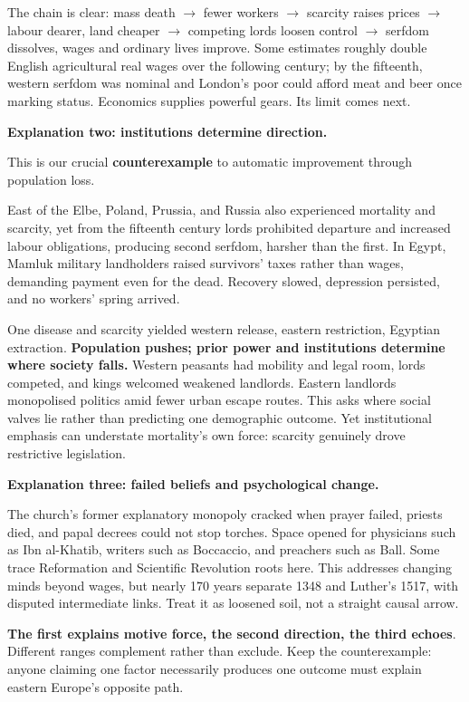 The chain is clear: mass death $\rightarrow$ fewer workers $\rightarrow$ scarcity raises prices $\rightarrow$ labour dearer, land cheaper $\rightarrow$ competing lords loosen control $\rightarrow$ serfdom dissolves, wages and ordinary lives improve. Some estimates roughly double English agricultural real wages over the following century; by the fifteenth, western serfdom was nominal and London's poor could afford meat and beer once marking status. Economics supplies powerful gears. Its limit comes next.

\textbf{Explanation two: institutions determine direction.}

This is our crucial \textbf{counterexample} to automatic improvement through population loss.

East of the Elbe, Poland, Prussia, and Russia also experienced mortality and scarcity, yet from the fifteenth century lords prohibited departure and increased labour obligations, producing second serfdom, harsher than the first. In Egypt, Mamluk military landholders raised survivors' taxes rather than wages, demanding payment even for the dead. Recovery slowed, depression persisted, and no workers' spring arrived.

One disease and scarcity yielded western release, eastern restriction, Egyptian extraction. \textbf{Population pushes; prior power and institutions determine where society falls.} Western peasants had mobility and legal room, lords competed, and kings welcomed weakened landlords. Eastern landlords monopolised politics amid fewer urban escape routes. This asks where social valves lie rather than predicting one demographic outcome. Yet institutional emphasis can understate mortality's own force: scarcity genuinely drove restrictive legislation.

\textbf{Explanation three: failed beliefs and psychological change.}

The church's former explanatory monopoly cracked when prayer failed, priests died, and papal decrees could not stop torches. Space opened for physicians such as Ibn al-Khatib, writers such as Boccaccio, and preachers such as Ball. Some trace Reformation and Scientific Revolution roots here. This addresses changing minds beyond wages, but nearly 170 years separate 1348 and Luther's 1517, with disputed intermediate links. Treat it as loosened soil, not a straight causal arrow.

\textbf{The first explains motive force, the second direction, the third echoes}. Different ranges complement rather than exclude. Keep the counterexample: anyone claiming one factor necessarily produces one outcome must explain eastern Europe's opposite path.

